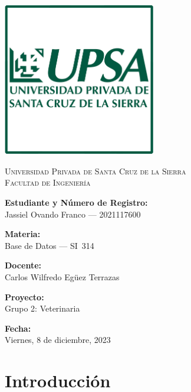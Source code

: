 \documentclass[
  12pt,
  hidelinks,
  a4paper,
  headings=standardclasses,
  headings=big,
  spanish
]{scrartcl}
\begin{document}
\begin{titlepage}
  \begin{center}
    \includegraphics[width=0.5\textwidth]{logo-upsa.png}
    \vspace*{\fill}
    
    \textsc{\Large{Universidad Privada de Santa Cruz de la Sierra}}\\
    \textsc{\Large{Facultad de Ingeniería}}
    \vspace*{\fill}
    
    \large{\textbf{Estudiante y Número de Registro:}}\\
    Jassiel Ovando Franco --- 2021117600
    \vspace*{\fill}
    
    \large{\textbf{Materia:}}\\
    Base de Datos --- SI~314
    \vspace*{\fill}
    
    \large{\textbf{Docente:}}\\
    Carlos Wilfredo Egüez Terrazas
    \vspace*{\fill}
    
    \large{\textbf{Proyecto:}}\\
    Grupo 2: Veterinaria
    \vspace*{\fill}
    
    \large{\textbf{Fecha:}}\\
    Viernes, 8 de diciembre, 2023
  \end{center}
\end{titlepage}

\newpage
{
  \hypersetup{linkcolor=black}
  \tableofcontents
  \pagebreak
  \listoffigures
}

\pagebreak
\section{Introducción}
\end{document}
